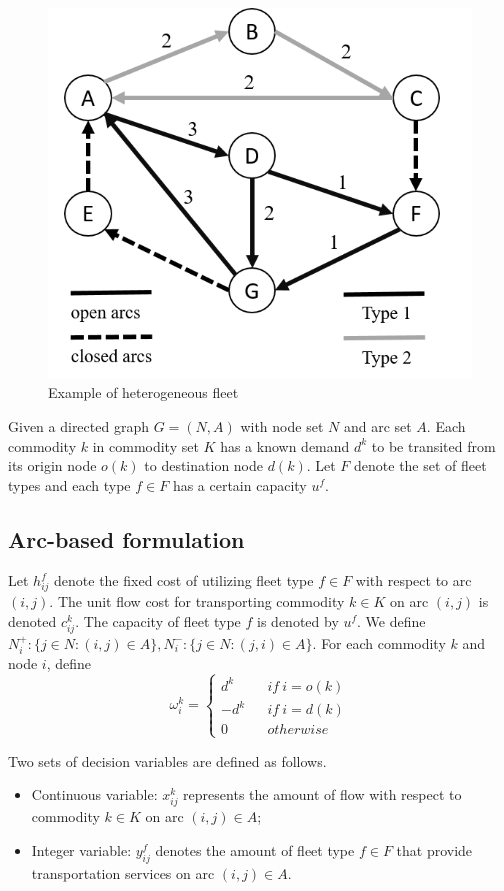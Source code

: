 \documentclass[11pt,nonblindrev,fleqn]{article}
\begin{document}
\begin{figure}[H]
\setlength{\abovecaptionskip}{-5pt}
\setlength{\belowcaptionskip}{-5pt}
\centering
\includegraphics[width=0.5\linewidth]{F2.png}
\caption{\small Example of heterogeneous fleet}
\label{Fig2}
\end{figure}

Given a directed graph $G=(N,A)$ with node set $N$ and arc set $A$. Each commodity $k$ in commodity set $K$ has a known demand $d^k$ to be transited from its origin node $o(k)$ to destination node $d(k)$. Let $F$ denote the set of fleet types and each type $f\in F$ has a certain capacity $u^f$.

\subsection{Arc-based formulation}
Let  $h_{ij}^f$ denote the fixed cost of utilizing fleet type $f\in F$ with respect to arc $(i,j)$. The unit flow cost for transporting commodity $k\in K$ on arc $(i,j)$ is denoted $c_{ij}^k$. The capacity of fleet type $f$ is denoted by $u^f$. We define $N_i^+:\{j\in N:(i,j)\in A\},N_i^-:\{j\in N:(j,i)\in A\}$. For each commodity $k$ and node $i$, define
\begin{equation*}
\omega_i^k= \left\{
\begin{aligned}
d^k&  & if \ i=o(k) \\
-d^k&  & if \ i=d(k) \\
0&  & otherwise
\end{aligned}
\right.
\end{equation*}

Two sets of decision variables are defined as follows.
\begin{itemize}
  \item Continuous variable: $x_{ij}^k$ represents the amount of flow with respect to commodity $k\in K$ on arc $(i,j)\in A$;
  \item Integer variable: $y_{ij}^f$ denotes the amount of fleet type $f\in F$ that provide transportation services on arc $(i,j)\in A$.
\end{itemize}
\end{document}
